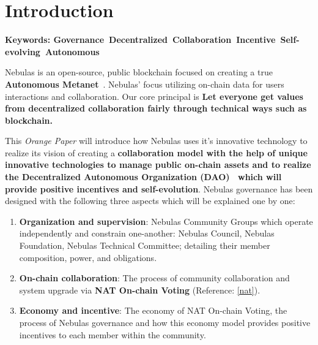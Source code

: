 
\section{Introduction}

\textbf{Keywords: Governance\ Decentralized\ Collaboration\ Incentive\ Self-evolving\ Autonomous }

\vspace{2em}

Nebulas is an open-source, public blockchain focused on creating a true \textbf{Autonomous Metanet}~\cite{AutonomousMetanet}. Nebulas' focus utilizing on-chain data for users interactions and collaboration. Our core principal is \textbf{Let everyone get values from decentralized collaboration fairly through technical ways such as blockchain.}~\cite{vision}

This \textit{Orange Paper} will introduce how Nebulas uses it's innovative technology to realize its vision of creating a \textbf{collaboration model with the help of unique innovative technologies to manage public on-chain assets and to realize the Decentralized Autonomous Organization (DAO)~\cite{DAO} which will provide positive incentives and self-evolution}. Nebulas governance has been designed with the following three aspects which will be explained one by one:

\begin{enumerate}
	\item \textbf{Organization and supervision}:
	Nebulas Community Groups which operate independently and constrain one-another: Nebulas Council, Nebulas Foundation, Nebulas Technical Committee; detailing their member composition, power, and obligations.
	\item \textbf{On-chain collaboration}:
	The process of community collaboration and system upgrade via \textbf{NAT On-chain Voting} (Reference: \ref{nat}).
	\item \textbf{Economy and incentive}: 
	The economy of NAT On-chain Voting, the process of Nebulas governance and how this economy model provides positive incentives to each member within the community.
\end{enumerate}
